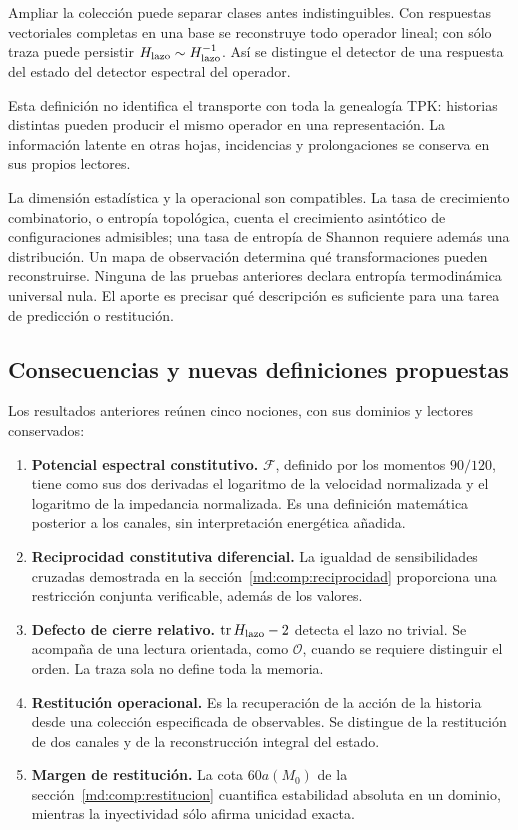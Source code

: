 Ampliar la colección puede separar clases antes indistinguibles.
Con respuestas vectoriales completas en una base se reconstruye todo
operador lineal; con sólo traza puede persistir
\(H_{\rm lazo}\sim H_{\rm lazo}^{-1}\).
Así se distingue el detector de una respuesta del estado del detector
espectral del operador.

Esta definición no identifica el transporte con toda la genealogía
TPK: historias distintas pueden producir el mismo operador en una
representación. La información latente en otras hojas, incidencias y
prolongaciones se conserva en sus propios lectores.

La dimensión estadística y la operacional son compatibles.
La tasa de crecimiento combinatorio, o entropía topológica, cuenta
el crecimiento asintótico de configuraciones admisibles; una tasa de
entropía de Shannon requiere además una distribución.
Un mapa de observación determina qué transformaciones pueden
reconstruirse. Ninguna de las pruebas anteriores declara entropía
termodinámica universal nula. El aporte es precisar qué descripción
es suficiente para una tarea de predicción o restitución.

\subsection{Consecuencias y nuevas definiciones propuestas}
\label{md:comp:consecuencias}

Los resultados anteriores reúnen cinco nociones, con sus dominios
y lectores conservados:
\begin{enumerate}
 \item \textbf{Potencial espectral constitutivo.}
 \(\mathscr F\), definido por los momentos \(90/120\), tiene como
 sus dos derivadas el logaritmo de la velocidad normalizada y el
 logaritmo de la impedancia normalizada. Es una definición matemática
 posterior a los canales, sin interpretación energética añadida.

 \item \textbf{Reciprocidad constitutiva diferencial.}
 La igualdad de sensibilidades cruzadas demostrada en la
 sección~\ref{md:comp:reciprocidad} proporciona una restricción
 conjunta verificable, además de los valores.

 \item \textbf{Defecto de cierre relativo.}
 \(\operatorname{tr}H_{\rm lazo}-2\) detecta el lazo no trivial.
 Se acompaña de una lectura orientada, como \(\mathcal O\), cuando
 se requiere distinguir el orden. La traza sola no define toda la memoria.

 \item \textbf{Restitución operacional.}
 Es la recuperación de la acción de la historia desde una colección
 especificada de observables. Se distingue de la restitución de dos
 canales y de la reconstrucción integral del estado.

 \item \textbf{Margen de restitución.}
 La cota \(60a(M_0)\) de la sección~\ref{md:comp:restitucion}
 cuantifica estabilidad absoluta en un dominio, mientras la
 inyectividad sólo afirma unicidad exacta.
\end{enumerate}

